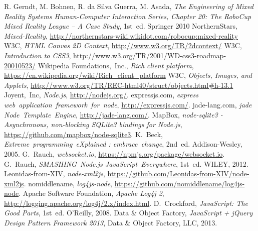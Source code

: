 \documentclass[journal]{IEEEtran}
\begin{document}
\begin{thebibliography}{1}

R. Gerndt, M. Bohnen, R. da Silva Guerra, M. Asada, \emph{The Engineering of
Mixed Reality Systems Human-Computer Interaction Series, Chapter 20: The RoboCup
Mixed Reality League – A Case Study}, 1st~ed. Springer 2010
NorthernStars, \emph{Mixed-Reality},
\url{http://northernstars-wiki.wikidot.com/robocup:mixed-reality}
W3C, \emph{HTML Canvas 2D Context}, \url{http://www.w3.org/TR/2dcontext/}
W3C, \emph{Introduction to CSS3},
\url{http://www.w3.org/TR/2001/WD-css3-roadmap-20010523/}
Wikipedia Foundations,~Inc., \emph{Rich client platform},
\url{https://en.wikipedia.org/wiki/Rich_client_platform}
W3C, \emph{Objects, Images, and Applets},
\url{http://www.w3.org/TR/REC-html40/struct/objects.html#h-13.1}
Joyent,~Inc, \emph{Node.js}, \url{http://nodejs.org/}.
expressjs.com, \emph{express web~application~framework~for~node}, \url{http://expressjs.com/}.
jade-lang.com, \emph{jade Node~Template~Engine}, \url{http://jade-lang.com/}.
MapBox, \emph{node-sqlite3 - Asynchronous, non-blocking SQLite3 bindings for Node.js}, \url{https://github.com/mapbox/node-sqlite3}.
K.~Beck, \emph{Extreme~programming~eXplained : embrace~change}, 2nd~ed. Addison-Wesley, 2005.
G.~Rauch, \emph{websocket.io}, \url{https://npmjs.org/package/websocket.io}.
G.~Rauch, \emph{SMASHING~Node.js JavaScript~Everywhere}, 1st~ed. WILEY, 2012.
Leonidas-from-XIV, \emph{node-xml2js}, \url{https://github.com/Leonidas-from-XIV/node-xml2js}.
nomiddlename, \emph{log4js-node}, \url{https://github.com/nomiddlename/log4js-node}.
Apache Software Foundation, \emph{Apache Log4j 2}, \url{http://logging.apache.org/log4j/2.x/index.html}.
D.~Crockford, \emph{JavaScript: The Good Parts}, 1st~ed. O'Reilly, 2008.
Data & Object Factory, \emph{JavaScript + jQuery Design Pattern Framework 2013}, Data & Object Factory, LLC, 2013.

\end{thebibliography}
\end{document}
